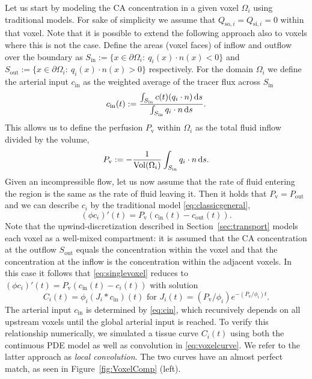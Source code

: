 \documentclass[journal,twocolumn]{IEEEtran}
\newcommand{\Perfv}{P_{\mathrm{v}}}
\begin{document}
	Let us start by modeling the CA concentration in a given voxel $\Omega_i$ using traditional models.
	For sake of simplicity we assume that $Q_{\mathrm{so},i} = Q_{\mathrm{si},i} = 0$ within that voxel.
	Note that it is possible to extend the following approach also to voxels where this is not the case.
	Define the areas (voxel faces) of inflow and outflow over the boundary as $S_{\mathrm{in}} := \{ x \in \partial \Omega_i: \ q_i(x) \cdot n(x) < 0 \}$ and $S_{\mathrm{out}}:= \{ x \in \partial \Omega_i: \ q_i(x) \cdot n(x) > 0 \}$ respectively.
	For the domain $\Omega_i$ we define the arterial input $c_{\mathrm{in}}$ as the weighted average of the tracer flux across $S_{\mathrm{in}}$
	\begin{equation}\label{eq:cin}
	 	c_{\mathrm{in}}(t):= \frac{\int_{S_{\mathrm{in}}}c(t)(q_i \cdot n) \diffint s}{\int_{S_{\mathrm{in}}} q_i \cdot n \diffint s}.
	\end{equation}
	This allows us to define the perfusion $\Perfv$ within $\Omega_i$ as the total fluid inflow divided by the volume,
	\begin{equation}\label{eq:perflocal}
		\Perfv :=-\frac{1}{\mathrm{Vol}( \Omega_i)}\int_{S_{\mathrm{in}}} q_i \cdot n \diffint s.
	\end{equation}
	Given an incompressible flow, let us now assume that the rate of fluid entering the region is the same as the rate of fluid leaving it. 
	Then it holds that $\Perfv=P_{\mathrm{out}}$ and we can describe $c_i$ by the traditional model \eqref{eq:classicgeneral},
	\begin{equation}\label{eq:singlevoxel}
		(\phi c_i)'(t)  = \Perfv (c_\mathrm{in}(t)  - c_\mathrm{out}(t)).
	\end{equation}
	Note that the upwind-discretization described in Section~\ref{sec:transport} models each voxel as a well-mixed compartment: it is assumed that the CA concentration at the outflow $S_\mathrm{out}$ equals the concentration within the voxel and that the concentration at the inflow is the concentration within the adjacent voxels.
	In this case it follows that \eqref{eq:singlevoxel} reduces to $(\phi c_i)'(t) = \Perfv (c_\mathrm{in}(t) - c_i(t))$ 
	with solution
	\begin{equation}\label{eq:voxelcurve}
		C_i(t) = \phi_i(J_i*c_{\mathrm{in}})(t)
			\text{ for } J_i(t)=(\Perfv/\phi_i)e^{- (\Perfv/\phi_i)t}.
	\end{equation}
	The arterial input $c_{\mathrm{in}}$ is determined by \eqref{eq:cin}, which recursively depends on all upstream voxels until the global arterial input is reached.
	To verify this relationship numerically, we simulated a tissue curve $C_i(t)$ using both the continuous PDE model as well as convolution in \eqref{eq:voxelcurve}.
	We refer to the latter approach as \textit{local convolution}. The two curves have an almost perfect match, as seen in Figure~\ref{fig:VoxelComp} (left).	
	
\end{document}
